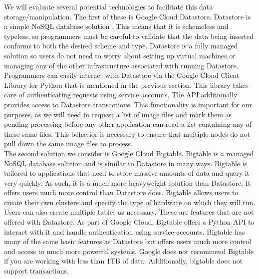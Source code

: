 \documentclass[10pt, onecolumn, draftclsnofoot, letterpaper, compsoc]{IEEEtran}
\begin{document}
We will evaluate several potential technologies to facilitate this data
storage/manipulation. The first of these is Google Cloud Datastore. Datastore
is a simple NoSQL database solution \cite{cloudDatastore}. This means that it is
schemeless and typeless, so programmers must be careful to validate that the
data being inserted conforms to both the desired scheme and type.
Datastore is a fully managed solution so users do not need to worry about setting
up virtual machines or managing any of the other infrastructure associated with
running Datastore\cite{cloudDatastore}. Programmers can easily interact with Datastore
via the Google Cloud Client Library for Python that is mentioned in the previous
section\cite{cloudDatastoreDocs}. This library takes care of authenticating requests
using service accounts\cite{cloudDatastoreDocs}. The API additionally provides access
to Datastore transactions\cite{cloudDatastoreDocs}. This functionality is important for
our purposes, as we will need to request a list of image files and mark them as pending
processing before any other application can read a list containing any of these same files.
This behavior is necessary to ensure that multiple nodes do not pull down the same image
files to process. \\

The second solution we consider is Google Cloud Bigtable. Bigtable is a managed NoSQL
database solution and is similar to Datastore in many ways\cite{cloudBigtable}.
Bigtable is tailored to applications that need to store massive amounts of data
and query it very quickly\cite{cloudBigtable}. As such, it is a much more heavyweight
solution than Datastore. It offers users much more control than Datastore does.
Bigtable allows users to create their own clusters and specify the type of hardware on
which they will run\cite{cloudBigtableDocs}. Users can also create multiple tables
as necessary\cite{cloudBigtableDocs}. These are features that are not offered with
Datastore. As part of Google Cloud, Bigtable offers a Python API to interact with it
and handle authentication using service accounts\cite{cloudBigtableDocs}. Bigtable has
many of the same basic features as Datastore but offers users much more control
and access to much more powerful systems. Google does not recommend Bigtable if
you are working with less than 1TB of data\cite{cloudBigtable}. Additionally,
bigtable does not support transactions\cite{cloudBigtable}. \\
\end{document}

